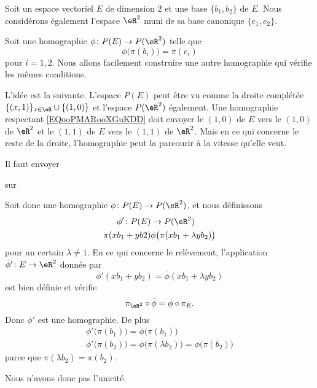 \begin{example}
    Soit un espace vectoriel \( E\) de dimension \( 2\) et une base \(  \{ b_1,b_2 \}  \) de \( E\). Nous considérons également l'espace \( \eR^2\) muni de sa base canonique \( \{ e_1,e_2 \}\).

    Soit une homographie \( \phi\colon P(E)\to P(\eR^2)\) telle que
    \begin{equation}        \label{EQooPMARooXGuKDD}
        \phi\big( \pi(b_i) \big)=\pi(e_i)
    \end{equation}
    pour \( i=1,2\). Nous allons facilement construire une autre homographie qui vérifie les mêmes conditions.

    L'idée est la suivante. L'espace \( P(E)\) peut être vu comme la droite complétée \( \{ (  x,1   ) \}_{x\in \eR}\cup\{ (1,0) \} \) et l'espace \( P(\eR^2)\) également. Une homographie respectant \eqref{EQooPMARooXGuKDD} doit envoyer le \( (1,0)\) de \( E\) vers le \( (1,0)\) de \( \eR^2\) et le \( (1,1)\) de \( E\) vers le \( (1,1)\) de \( \eR^2\). Mais en ce qui concerne le reste de la droite, l'homographie peut la parcourir à la vitesse qu'elle veut.

    Il faut envoyer

    \begin{center}
   
   sur
   
    \end{center}

    Soit donc une homographie \( \phi\colon P(E)\to P(\eR^2)\), et nous définissons
    \begin{equation}
        \begin{aligned}
            \phi'\colon P(E)&\to P(\eR^2) \\
            \pi(xb_1+yb2)& \phi\big( \pi(xb_1+\lambda yb_2) \big)
        \end{aligned}
    \end{equation}
    pour un certain \( \lambda\neq 1\). En ce qui concerne le relèvement, l'application \( \bar\phi'\colon E\to \eR^2\) donnée par
    \begin{equation}
        \bar\phi'(xb_1+yb_2)=\bar\phi(xb_1+\lambda yb_2)
    \end{equation}
    est bien définie et vérifie
    \begin{equation}
        \pi_{\eR^2}\circ\bar\phi=\phi\circ\pi_E.
    \end{equation}
    Donc \( \phi'\) est une homographie. De plus
    \begin{subequations}
        \begin{align}
            \phi'\big( \pi(b_1) \big)=\phi\big( \pi(b_1) \big)\\
            \phi'\big( \pi(b_2) \big)=\phi\big( \pi(\lambda b_2) \big)=\phi\big( \pi(b_2) \big)
        \end{align}
    \end{subequations}
    parce que \( \pi(\lambda b_2)=\pi(b_2)\).

    Nous n'avons donc pas l'unicité.
\end{example}

